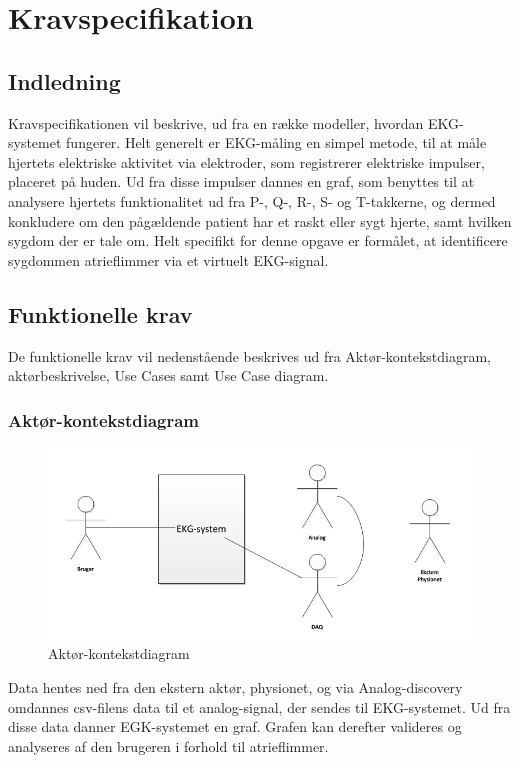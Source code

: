 \chapter{Kravspecifikation}

\section{Indledning}
Kravspecifikationen vil beskrive, ud fra en række modeller, hvordan EKG-systemet fungerer. Helt generelt er EKG-måling en simpel metode, til at måle hjertets elektriske aktivitet via elektroder, som registrerer elektriske impulser, placeret på huden. Ud fra disse impulser dannes en graf, som benyttes til at analysere hjertets funktionalitet ud fra P-, Q-, R-, S- og T-takkerne, og dermed konkludere om den pågældende patient har et raskt eller sygt hjerte, samt hvilken sygdom der er tale om. Helt specifikt for denne opgave er formålet, at identificere sygdommen atrieflimmer via et virtuelt EKG-signal. 

\section{Funktionelle krav}
De funktionelle krav vil nedenstående beskrives ud fra Aktør-kontekstdiagram, aktørbeskrivelse, Use Cases samt Use Case diagram. 

\subsection{Aktør-kontekstdiagram}

\begin{figure}[htb]
	\centering
	\includegraphics[width=1\textwidth]{Figurer/Snip20150327_25}
	\caption{Aktør-kontekstdiagram}
	\label{fig:aktoerbeskrivelse}
\end{figure}

Data hentes ned fra den ekstern aktør, physionet, og via Analog-discovery omdannes csv-filens data til et analog-signal, der sendes til EKG-systemet. Ud fra disse data danner EGK-systemet en graf. Grafen kan derefter valideres og analyseres af den brugeren i forhold til atrieflimmer. 

